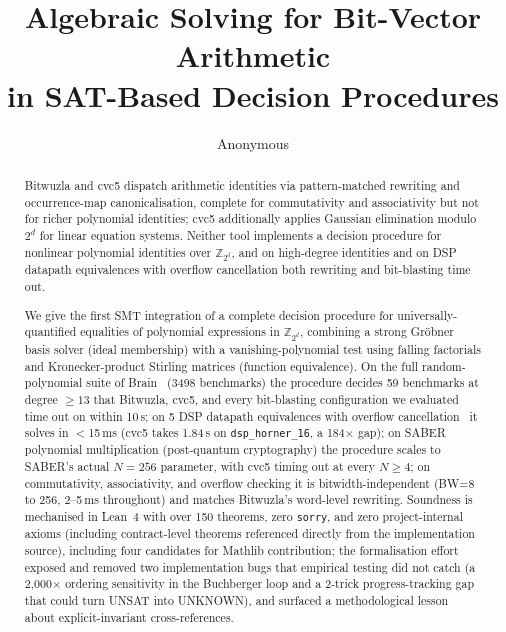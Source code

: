 \documentclass[runningheads]{llncs}
\begin{document}
\title{Algebraic Solving for Bit-Vector Arithmetic\\in SAT-Based Decision Procedures}


\author{Anonymous}


\maketitle

\begin{abstract}
Bitwuzla and cvc5 dispatch arithmetic identities via
pattern-matched rewriting and occurrence-map canonicalisation,
complete for commutativity and associativity but not for richer
polynomial identities; cvc5 additionally applies Gaussian
elimination modulo $2^d$ for linear equation systems. Neither
tool implements a decision procedure for nonlinear polynomial
identities over $\mathbb{Z}_{2^d}$, and on high-degree identities
and on DSP datapath equivalences with overflow cancellation both
rewriting and bit-blasting time out.

We give the first SMT integration of a complete decision
procedure for universally-quantified equalities of polynomial
expressions in $\mathbb{Z}_{2^d}$, combining a strong Gr\"obner
basis solver (ideal membership) with a vanishing-polynomial test
using falling factorials and Kronecker-product Stirling matrices
(function equivalence). On the full random-polynomial
suite of Brain~\cite{brain2025subpoly} (3498 benchmarks) the
procedure decides 59
benchmarks at degree $\geq 13$ that Bitwuzla, cvc5, and every
bit-blasting configuration we evaluated time out on within
10\,s; on 5 DSP datapath equivalences with overflow
cancellation~\cite{shekhar2007equivalence,gamez2024efficient}
it solves in $<$15\,ms (cvc5 takes 1.84\,s on
\texttt{dsp\_horner\_16}, a 184$\times$ gap); on
SABER~\cite{daemen2018saber} polynomial multiplication
(post-quantum cryptography) the procedure scales to SABER's
actual $N=256$ parameter, with cvc5 timing out at every
$N \geq 4$; on commutativity, associativity, and overflow
checking it is bitwidth-independent (BW=8 to 256, 2--5\,ms
throughout) and matches Bitwuzla's word-level rewriting. Soundness is mechanised in
Lean~4 with over 150 theorems, zero \texttt{sorry}, and zero
project-internal axioms (including contract-level
theorems referenced directly from the implementation source),
including four candidates for Mathlib contribution; the
formalisation effort exposed and removed two implementation bugs
that empirical testing did not catch (a 2{,}000$\times$ ordering
sensitivity in the Buchberger loop and a 2-trick
progress-tracking gap that could turn UNSAT into UNKNOWN), and
surfaced a methodological lesson about explicit-invariant
cross-references.

\end{abstract}
\end{document}
